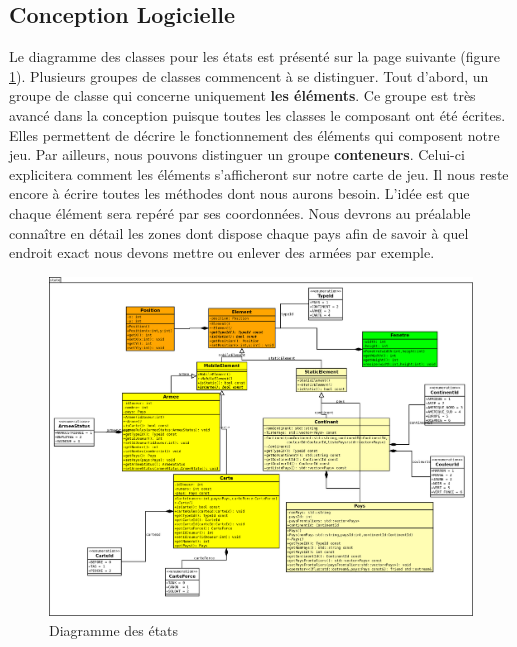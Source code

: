 \subsection{Conception Logicielle}
Le diagramme des classes pour les états est présenté sur la page suivante (figure \ref{fig:state}). Plusieurs groupes de classes commencent à se distinguer. 
Tout d'abord, un groupe de classe qui concerne uniquement \textbf{les éléments}. Ce groupe est très avancé dans la conception puisque toutes les classes le composant ont été écrites. Elles permettent de décrire le fonctionnement des éléments qui composent notre jeu. 
\newline 
\newline 
Par ailleurs, nous pouvons distinguer un groupe \textbf{conteneurs}. Celui-ci explicitera comment les éléments s'afficheront sur notre carte de jeu. Il nous reste encore à écrire toutes les méthodes dont nous aurons besoin. L'idée est que chaque élément sera repéré par ses coordonnées. Nous devrons au préalable connaître en détail les zones dont dispose chaque pays afin de savoir à quel endroit exact nous devons mettre ou enlever des armées par exemple.  

\newpage

\begin{landscape}
    \begin{figure}[!htbp]
        \centering
        \includegraphics[width=21cm]{Images/state.png}
        \caption{Diagramme des états}
        \label{fig:state}
    \end{figure}
\end{landscape}